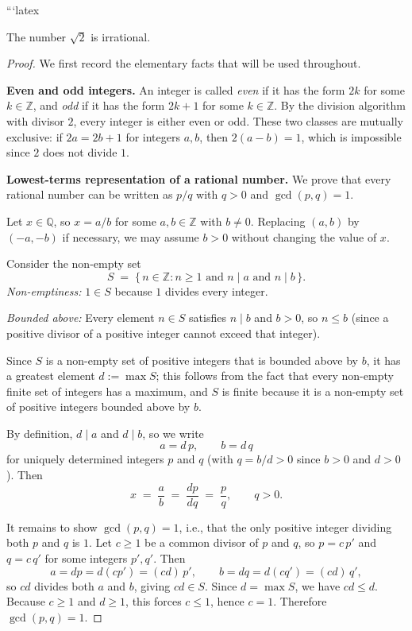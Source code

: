 ```latex
\begin{theorem}
The number $\sqrt{2}$ is irrational.
\end{theorem}

\begin{proof}
We first record the elementary facts that will be used throughout.

\medskip
\noindent\textbf{Even and odd integers.}
An integer is called \emph{even} if it has the form $2k$ for some $k\in\mathbb{Z}$, and \emph{odd} if it has the form $2k+1$ for some $k\in\mathbb{Z}$. By the division algorithm with divisor $2$, every integer is either even or odd. These two classes are mutually exclusive: if $2a=2b+1$ for integers $a,b$, then $2(a-b)=1$, which is impossible since $2$ does not divide $1$.

\medskip
\noindent\textbf{Lowest-terms representation of a rational number.}
We prove that every rational number can be written as $p/q$ with $q>0$ and $\gcd(p,q)=1$.

Let $x\in\mathbb{Q}$, so $x=a/b$ for some $a,b\in\mathbb{Z}$ with $b\neq 0$. Replacing $(a,b)$ by $(-a,-b)$ if necessary, we may assume $b>0$ without changing the value of $x$.

Consider the non-empty set
\[
S \;=\; \{\, n\in\mathbb{Z} : n\geq 1 \text{ and } n\mid a \text{ and } n\mid b\,\}.
\]
\emph{Non-emptiness:} $1\in S$ because $1$ divides every integer.

\emph{Bounded above:} Every element $n\in S$ satisfies $n\mid b$ and $b>0$, so $n\leq b$ (since a positive divisor of a positive integer cannot exceed that integer).

Since $S$ is a non-empty set of positive integers that is bounded above by $b$, it has a greatest element $d:=\max S$; this follows from the fact that every non-empty finite set of integers has a maximum, and $S$ is finite because it is a non-empty set of positive integers bounded above by $b$.

By definition, $d\mid a$ and $d\mid b$, so we write
\[
a = d\,p,\qquad b = d\,q
\]
for uniquely determined integers $p$ and $q$ (with $q = b/d > 0$ since $b > 0$ and $d > 0$). Then
\[
x \;=\; \frac{a}{b} \;=\; \frac{dp}{dq} \;=\; \frac{p}{q}, \qquad q > 0.
\]

It remains to show $\gcd(p,q)=1$, i.e., that the only positive integer dividing both $p$ and $q$ is $1$. Let $c\geq 1$ be a common divisor of $p$ and $q$, so $p=c\,p'$ and $q=c\,q'$ for some integers $p',q'$. Then
\[
a = dp = d(cp') = (cd)\,p', \qquad b = dq = d(cq') = (cd)\,q',
\]
so $cd$ divides both $a$ and $b$, giving $cd\in S$. Since $d = \max S$, we have $cd\leq d$. Because $c\geq 1$ and $d\geq 1$, this forces $c\leq 1$, hence $c=1$. Therefore $\gcd(p,q)=1$.


\end{proof}
